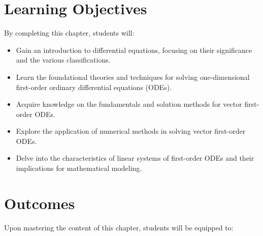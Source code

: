 
\section*{Learning Objectives}By completing this chapter, students will:

\begin{itemize}
\item Gain an introduction to differential equations, focusing on their significance and the various classifications.
\item Learn the foundational theories and techniques for solving one-dimensional first-order ordinary differential equations (ODEs).
\item Acquire knowledge on the fundamentals and solution methods for vector first-order ODEs.
\item Explore the application of numerical methods in solving vector first-order ODEs.
\item Delve into the characteristics of linear systems of first-order ODEs and their implications for mathematical modeling.
\end{itemize}

\section*{Outcomes}
Upon mastering the content of this chapter, students will be equipped to:

